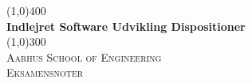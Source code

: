 
\newcommand{\myTitle}{Indlejret Software Udvikling Dispositioner}


\begin{titlepage}
	
	\begin{center}
		\line(1,0){400} \\
		[0.5cm]
		\huge{\bfseries \myTitle} \\
		[0cm]
		\line(1,0){300} \\
		[1.5cm]
		\textsc{\LARGE Aarhus School of Engineering} \\
		[0.1cm]
		\textsc{\large Eksamensnoter} \\
		[10cm]
	\end{center}
	
	
\end{titlepage}